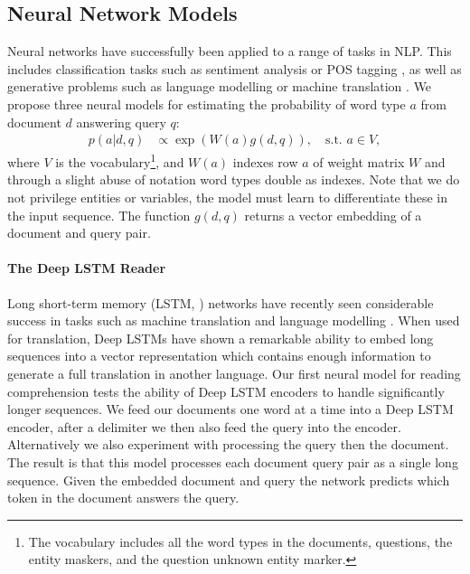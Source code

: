 \documentclass{article}
\begin{document}
\subsection{Neural Network Models}
Neural networks have successfully been applied to a range of tasks in NLP.
This includes classification tasks such as sentiment analysis
\cite{Kalchbrenner:2014:DCNN} or POS tagging \cite{Collobert:2011:NLP}, as well
as generative problems such as language modelling or machine translation
\cite{Sutskever:2014:SSLNN}.
We propose three neural models for estimating the probability of word type $a$
from document $d$ answering query $q$:
\begin{align*}
  p(a | d, q) &\propto \exp \left(W(a) g(d,q) \right), \quad\text{s.t. } a \in
  V,
\end{align*}
where $V$ is the vocabulary\footnote{The vocabulary includes all the word types
  in the documents, questions, the entity maskers, and the question unknown
  entity marker.},
and $W(a)$ indexes row $a$ of weight matrix $W$ and through a slight abuse of
notation word types double as indexes. Note that we do not privilege entities or
variables, the model must learn to differentiate these in the input sequence.
The function $g(d,q)$ returns a vector embedding of a document and query pair.

\paragraph{The Deep LSTM Reader}
Long short-term memory (LSTM, \cite{Hochreiter:1997:LSTM}) networks have
recently seen considerable success in tasks such as machine translation and
language modelling \cite{Sutskever:2014:SSLNN}. When used for translation, Deep
LSTMs \cite{Graves:2012:SSLRNN} have shown a remarkable ability to embed long
sequences into a vector representation which contains enough information to
generate a full translation in another language. Our first neural model for
reading comprehension tests the ability of Deep LSTM encoders to handle
significantly longer sequences. We feed our documents one word at a time into
a Deep LSTM encoder, after a delimiter we then also feed the query into the
encoder. Alternatively we also experiment with processing the query then the
document. The result is that this model processes each document query pair as a
single long sequence. Given the embedded document and query the network
predicts which token in the document answers the query.
\end{document}
